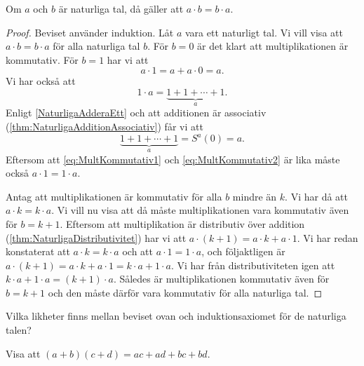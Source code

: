 \begin{theorem}[Kommutativitet]
  Om \(a\) och \(b\) är naturliga tal, då gäller att \(a\cdot b=b\cdot a\).
\end{theorem}
\begin{proof}
  Beviset använder induktion.
  Låt \(a\) vara ett naturligt tal.
  Vi vill visa att \(a\cdot b = b\cdot a\) för alla naturliga tal \(b\).
  För \(b=0\) är det klart att multiplikationen är kommutativ.
  För \(b=1\) har vi att
  \begin{equation}
    \label{eq:MultKommutativ1}
    a\cdot 1 = a+a\cdot 0 = a.
  \end{equation}
  Vi har också att
  \begin{equation*}
    1\cdot a = \underbrace{1+1+\cdots+1}_a.
  \end{equation*}
  Enligt \cref{NaturligaAdderaEtt} och att additionen är associativ
  (\cref{thm:NaturligaAdditionAssociativ}) får vi att
  \begin{equation}
    \label{eq:MultKommutativ2}
    \underbrace{1+1+\cdots+1}_a = S^a(0) = a.
  \end{equation}
  Eftersom att \cref{eq:MultKommutativ1} och \cref{eq:MultKommutativ2} är
  lika måste också \(a\cdot 1 = 1\cdot a\).

  Antag att multiplikationen är kommutativ för alla \(b\) mindre än \(k\).
  Vi har då att \(a\cdot k = k\cdot a\).
  Vi vill nu visa att då måste multiplikationen vara kommutativ även för
  \(b=k+1\).
  Eftersom att multiplikation är distributiv över addition
  (\cref{thm:NaturligaDistributivitet}) har vi att \(a\cdot (k+1) = a\cdot
  k + a\cdot 1\).
  Vi har redan konstaterat att \(a\cdot k = k\cdot a\) och att \(a\cdot 1 =
  1\cdot a\), och följaktligen är \(a\cdot (k+1) = a\cdot k + a\cdot 1 =
  k\cdot a + 1\cdot a\).
  Vi har från distributiviteten igen att \(k\cdot a + 1\cdot a = (k+1)\cdot
  a\).
  Således är multiplikationen kommutativ även för \(b=k+1\) och den måste
  därför vara kommutativ för alla naturliga tal.
\end{proof}
\begin{exercise}
  Vilka likheter finns mellan beviset ovan och induktionsaxiomet för de
  naturliga talen?
\end{exercise}

\begin{exercise}
  Visa att \((a+b)(c+d) = ac+ad+bc+bd\).
\end{exercise}


